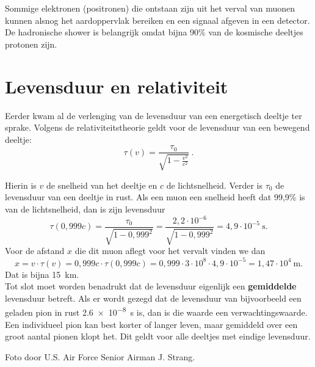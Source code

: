 Sommige elektronen (positronen) die ontstaan zijn uit het verval van
muonen kunnen alsnog het aardoppervlak bereiken en een signaal afgeven
in een \hisparc detector.
\\

De hadronische shower is belangrijk omdat bijna 90\% van de kosmische
deeltjes protonen zijn.


\section{Levensduur en relativiteit}

Eerder kwam al de verlenging van de levensduur van een energetisch
deeltje ter sprake. Volgens de relativiteitstheorie geldt voor de
levensduur van een bewegend deeltje:
\begin{equation}
    \tau (v) = \frac{\tau_0}{\sqrt{1-\frac{v^2}{c^2}}} \ . \nonumber
\end{equation}

Hierin is $v$ de snelheid van het deeltje en $c$ de lichtsnelheid.
Verder is $\tau_0$ de levensduur van een deeltje in rust. Als een muon
een snelheid heeft dat 99,9\% is van de lichtsnelheid, dan is zijn
levensduur
\begin{equation}
    \tau(0,999c) = \frac{\tau_0}{\sqrt{1-0,999^2}}
    = \frac{2,2 \cdot 10^{-6}}{\sqrt{1-0,999^2}}
    = 4,9 \cdot 10^{-5} \SI{}{\second}. \nonumber
\end{equation}
Voor de afstand $x$ die dit muon aflegt voor het vervalt vinden we dan
\begin{equation}
    x = v \cdot \tau (v)
    = 0,999c \cdot \tau (0,999c)
    = 0,999 \cdot 3 \cdot 10^8 \cdot 4,9 \cdot 10^{-5}
    = 1,47 \cdot 10^4 \SI{}{\meter}. \nonumber
\end{equation}
Dat is bijna \SI{15}{\km}.
\\

Tot slot moet worden benadrukt dat de levensduur eigenlijk een
\textbf{gemiddelde} levensduur betreft. Als er wordt gezegd dat de
levensduur van bijvoorbeeld een geladen pion in rust
\SI{2,6e-8}{\second} is, dan is die waarde een verwachtingswaarde. Een
individueel pion kan best korter of langer leven, maar gemiddeld over
een groot aantal pionen klopt het. Dit geldt voor alle deeltjes met
eindige levensduur.


\begin{thebibliography}{9}
     Foto door U.S. Air Force Senior Airman J. Strang.
\end{thebibliography}



